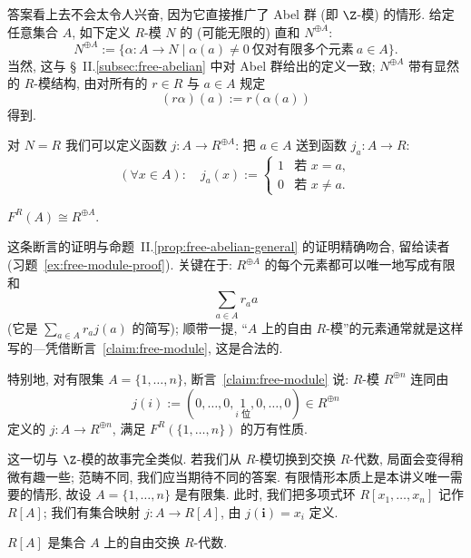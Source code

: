 答案看上去不会太令人兴奋, 因为它直接推广了 Abel 群 (即 $\Z$-模) 的情形. 给定任意集合 $A$, 如下定义 $R$-模 $N$ 的 (可能无限的) 直和 $N^{\oplus A}$:
\[
N^{\oplus A} := \{\alpha : A \to N \mid \alpha(a) \neq 0 \ \text{仅对有限多个元素}\ a \in A\}.
\]
当然, 这与 \S~II.\ref{subsec:free-abelian} 中对 Abel 群给出的定义一致; $N^{\oplus A}$ 带有显然的 $R$-模结构, 由对所有的 $r \in R$ 与 $a \in A$ 规定
\[
(r\alpha)(a) := r(\alpha(a))
\]
得到.

对 $N = R$ 我们可以定义函数 $j : A \to R^{\oplus A}$: 把 $a \in A$ 送到函数 $j_a : A \to R$:
\[
(\forall x \in A): \quad j_a(x) := \begin{cases} 1 & \text{若 } x = a, \\ 0 & \text{若 } x \neq a. \end{cases}
\]

\begin{claim}
\label{claim:free-module}
$F^R(A) \cong R^{\oplus A}$.
\end{claim}

这条断言的证明与命题~II.\ref{prop:free-abelian-general} 的证明精确吻合, 留给读者 (习题~\ref{ex:free-module-proof}). 关键在于: $R^{\oplus A}$ 的每个元素都可以唯一地写成有限和
\[
\sum_{a \in A} r_a a
\]
(它是 $\sum_{a \in A} r_a j(a)$ 的简写); 顺带一提, ``$A$ 上的自由 $R$-模''的元素通常就是这样写的---凭借断言~\ref{claim:free-module}, 这是合法的.

特别地, 对有限集 $A = \{1, \ldots, n\}$, 断言~\ref{claim:free-module} 说: $R$-模 $R^{\oplus n}$ 连同由
\[
j(i) := (0, \dots, 0, \underset{i \text{ 位}}{1}, 0, \dots, 0) \in R^{\oplus n}
\]
定义的 $j : A \to R^{\oplus n}$, 满足 $F^R(\{1, \ldots, n\})$ 的万有性质.

这一切与 $\Z$-模的故事完全类似. 若我们从 $R$-模切换到交换 $R$-代数, 局面会变得稍微有趣一些; 范畴不同, 我们应当期待不同的答案. 有限情形本质上是本讲义唯一需要的情形, 故设 $A = \{1, \ldots, n\}$ 是有限集. 此时, 我们把多项式环 $R[x_1, \ldots, x_n]$ 记作 $R[A]$; 我们有集合映射 $j : A \to R[A]$, 由 $j(\mathbf{i}) = x_i$ 定义.

\begin{proposition}
\label{prop:free-algebra}
$R[A]$ 是集合 $A$ 上的自由交换 $R$-代数.
\end{proposition}

